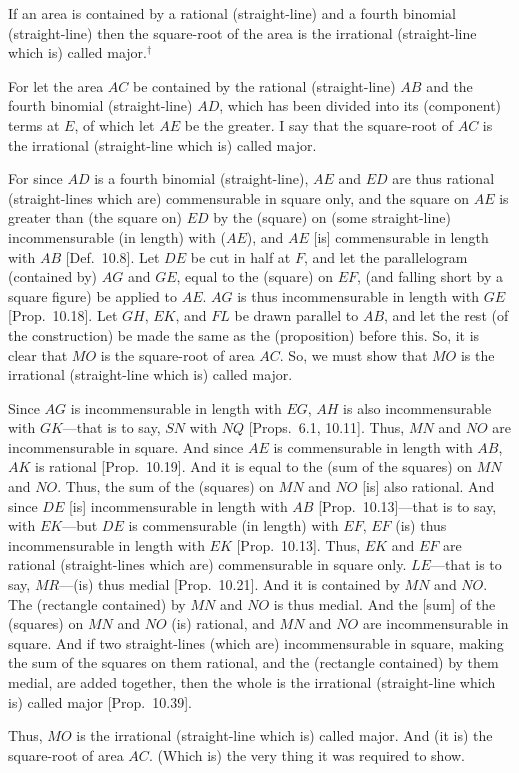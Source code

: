 \begin{Parallel}{}{}
{If an area is contained by a rational (straight-line)
and a fourth binomial (straight-line) then the square-root of the area
is the irrational (straight-line which is) called major.$^\dag$

\epsfysize=1.3in
\centerline{}

For let the area $AC$ be contained by the rational (straight-line) $AB$
and the fourth binomial (straight-line) $AD$, which has been divided into
its (component) terms at $E$, of which let $AE$ be the greater. I say that
the square-root of $AC$ is the irrational (straight-line which is) called major.

For since $AD$ is a fourth binomial (straight-line), $AE$ and $ED$
are thus rational (straight-lines which are) commensurable in square only,
and the square on $AE$ is greater than (the square on) $ED$ by the
(square) on (some straight-line) incommensurable (in length) with ($AE$),
and $AE$ [is] commensurable in length with $AB$ [Def.~10.8]. Let $DE$ be cut in half at $F$,
and let the parallelogram (contained by) $AG$ and $GE$, equal to the
(square) on $EF$, (and falling short by a square figure) be applied to
$AE$. $AG$ is thus incommensurable in length with $GE$ [Prop.~10.18]. Let $GH$, $EK$, and $FL$
be drawn parallel to $AB$, and let the rest (of the construction) be made the same as the (proposition) before this. So, it is clear that
$MO$ is the square-root of  area $AC$. So, we must show that $MO$
is the irrational (straight-line which is) called major.

Since $AG$ is incommensurable in length with $EG$, $AH$
is also incommensurable with $GK$---that is to say, $SN$
 with $NQ$ [Props.~6.1, 10.11].  Thus, $MN$ and $NO$
 are incommensurable in square. And since $AE$ is
 commensurable in length with $AB$, $AK$ is rational [Prop.~10.19].  And it is equal to the (sum of the squares) on $MN$ and $NO$.  Thus, the sum of the (squares) on 
 $MN$ and $NO$ [is] also rational. And since $DE$ [is]  incommensurable
 in length with $AB$ [Prop.~10.13]---that is to say, with $EK$---but $DE$ is commensurable (in length) with $EF$, $EF$ (is) thus incommensurable
 in length with $EK$ [Prop.~10.13].
 Thus, $EK$ and $EF$ are rational (straight-lines which are) commensurable
 in square only. $LE$---that is to say, $MR$---(is) thus medial
 [Prop.~10.21]. And it is contained by $MN$ and $NO$. The (rectangle contained) by $MN$ and $NO$ is thus medial. And
 the [sum] of the (squares) on $MN$ and $NO$ (is) rational, and
 $MN$ and $NO$ are incommensurable in square. And if two
 straight-lines (which are) incommensurable in square, making the
 sum of the squares on them rational, and the (rectangle contained) by them
 medial, are added together, then the whole is the irrational (straight-line which is) called major [Prop.~10.39].
 
 Thus, $MO$ is the irrational (straight-line which is) called major.
 And (it is) the square-root of area $AC$. (Which is) the very thing it
 was required to show.}
\end{Parallel}
